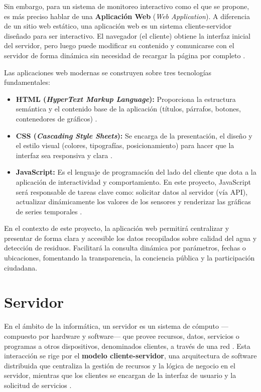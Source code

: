 Sin embargo, para un sistema de monitoreo interactivo como el que se propone, es más preciso hablar de una \textbf{Aplicación Web} (\textit{Web Application}). A diferencia de un sitio web estático, una aplicación web es un sistema cliente-servidor diseñado para ser interactivo. El navegador (el cliente) obtiene la interfaz inicial del servidor, pero luego puede modificar su contenido y comunicarse con el servidor de forma dinámica sin necesidad de recargar la página por completo \cite{lujan2011programacion, mdn2024web}.

Las aplicaciones web modernas se construyen sobre tres tecnologías fundamentales:

\begin{itemize}
    \item \textbf{HTML (\textit{HyperText Markup Language}):} Proporciona la estructura semántica y el contenido base de la aplicación (títulos, párrafos, botones, contenedores de gráficos) \cite{mdn2024html}.
    \item \textbf{CSS (\textit{Cascading Style Sheets}):} Se encarga de la presentación, el diseño y el estilo visual (colores, tipografías, posicionamiento) para hacer que la interfaz sea responsiva y clara \cite{mdn2024css}.
    \item \textbf{JavaScript:} Es el lenguaje de programación del lado del cliente que dota a la aplicación de interactividad y comportamiento. En este proyecto, JavaScript será responsable de tareas clave como: solicitar datos al servidor (vía API), actualizar dinámicamente los valores de los sensores y renderizar las gráficas de series temporales \cite{mdn2024javascript}.
\end{itemize}

En el contexto de este proyecto, la aplicación web permitirá centralizar y presentar de forma clara y accesible los datos recopilados sobre calidad del agua y detección de residuos. Facilitará la consulta dinámica por parámetros, fechas o ubicaciones, fomentando la transparencia, la conciencia pública y la participación ciudadana.


\section{Servidor}

En el ámbito de la informática, un servidor es un sistema de cómputo —compuesto por hardware y software— que provee recursos, datos, servicios o programas a otros dispositivos, denominados clientes, a través de una red \cite{Espana2003}. Esta interacción se rige por el \textbf{modelo cliente-servidor}, una arquitectura de software distribuida que centraliza la gestión de recursos y la lógica de negocio en el servidor, mientras que los clientes se encargan de la interfaz de usuario y la solicitud de servicios \cite{Britannica2024}.

